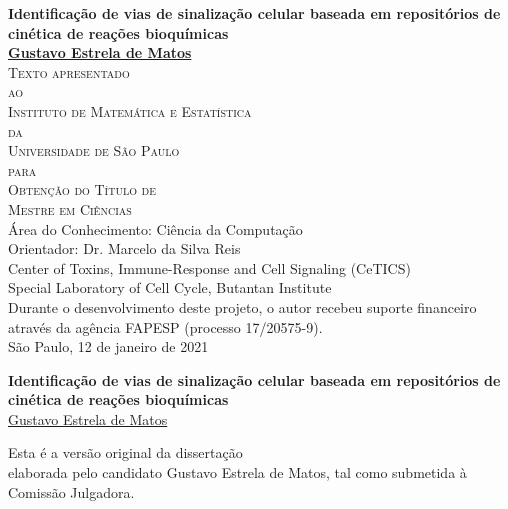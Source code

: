 \documentclass[12pt, twoside]{report}
\numberwithin{mydefinition}{section}
\numberwithin{mytheorem}{section}
\numberwithin{mylemma}{section}
\numberwithin{corollary}{section}
\begin{document}
\thispagestyle{empty}
\begin{center}
{\Large
{\bf Identificação de vias de sinalização celular baseada em
    repositórios de cinética de reações bioquímicas}\\
\bigskip
\bigskip
\bigskip
\bigskip
    {\bf \href{mailto:gustavo.estrela.matos@gmail.com}{Gustavo Estrela de Matos}}\\
\bigskip
\bigskip
\bigskip
\bigskip
\textsc{
    Texto apresentado\\[-0.25cm] 
    ao\\[-0.25cm]
    Instituto de Matemática e Estatística\\[-0.25cm]
    da\\[-0.25cm]
    Universidade de São Paulo\\[-0.25cm]
    para\\[-0.25cm]
    Obtenção do Título de\\
    Mestre em Ciências\\
    }
\bigskip
\bigskip
\bigskip
\bigskip
Área do Conhecimento: Ciência da Computação\\
\bigskip
Orientador: Dr. Marcelo da Silva Reis\\
\bigskip
\bigskip
\bigskip
\bigskip
\bigskip
\bigskip
\bigskip
\bigskip
Center of Toxins, Immune-Response and Cell Signaling (CeTICS)\\
\bigskip
Special Laboratory of Cell Cycle, Butantan Institute\\
\bigskip
\bigskip
{\normalsize Durante o desenvolvimento deste projeto, o autor recebeu
    suporte financeiro através da agência FAPESP (processo 17/20575-9).}\\
\bigskip
\bigskip
\bigskip
São Paulo, 12 de janeiro de 2021
}
\end{center}
\newpage


\thispagestyle{empty}
\begin{center}
{\Large
{\bf Identificação de vias de sinalização celular baseada em
    repositórios de cinética de reações bioquímicas}\\
\bigskip
\bigskip
\bigskip
\bigskip
\bigskip
\bigskip
\bigskip
\bigskip
\bigskip
    {\href{mailto:gustavo.estrela.matos@gmail.com}{Gustavo Estrela de Matos}}\\
\bigskip
\bigskip
\bigskip
\bigskip
\bigskip
\bigskip
\bigskip
\bigskip
\bigskip
\bigskip
\bigskip
\bigskip
\bigskip
\bigskip
\bigskip
\hfill
\begin{minipage}{15em}
{\small Esta é a versão original da dissertação\\
elaborada pelo candidato Gustavo Estrela de Matos,
tal como submetida à Comissão Julgadora.}
\end{minipage}
\bigskip
\bigskip
}
\end{center}
\newpage
\end{document}

